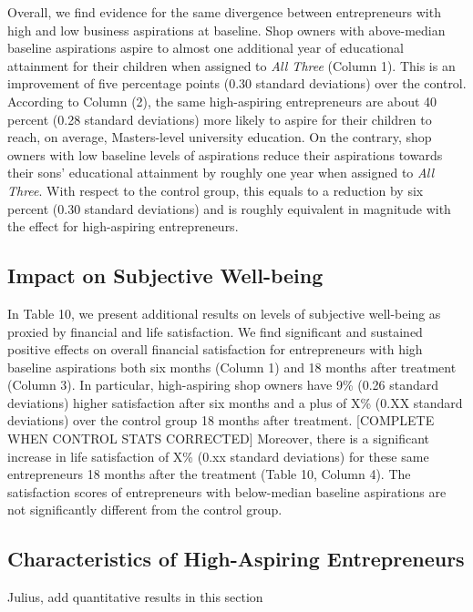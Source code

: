 \documentclass[11.5pt]{article}
\begin{document}
Overall, we find evidence for the same divergence between entrepreneurs with high and low business aspirations at baseline. Shop owners with above-median baseline aspirations aspire to almost one additional year of educational attainment for their children when assigned to \emph{All Three} (Column 1). This is an improvement of five percentage points (0.30 standard deviations) over the control. According to Column (2), the same high-aspiring entrepreneurs are about 40 percent (0.28 standard deviations) more likely to aspire for their children to reach, on average, Masters-level university education. On the contrary, shop owners with low baseline levels of aspirations reduce their aspirations towards their sons' educational attainment by roughly one year when assigned to \emph{All Three}. With respect to the control group, this equals to a reduction by six percent (0.30 standard deviations) and is roughly equivalent in magnitude with the effect for high-aspiring entrepreneurs.

\subsection{Impact on Subjective Well-being}

In Table 10, we present additional results on levels of subjective well-being as proxied by financial and life satisfaction. We find significant and sustained positive effects on overall financial satisfaction for entrepreneurs with high baseline aspirations both six months (Column 1) and 18 months after treatment (Column 3). In particular, high-aspiring shop owners have 9\% (0.26 standard deviations) higher satisfaction after six months and a plus of X\% (0.XX standard deviations) over the control group 18 months after treatment. [\textcolor[rgb]{1.00,0.00,0.00}{COMPLETE WHEN CONTROL STATS CORRECTED}] Moreover, there is a significant increase in life satisfaction of X\% (0.xx standard deviations) for these same entrepreneurs 18 months after the treatment (Table 10, Column 4). The satisfaction scores of entrepreneurs with below-median baseline aspirations are not significantly different from the control group.

\subsection{Characteristics of High-Aspiring Entrepreneurs}

\textcolor[rgb]{1.00,0.00,0.00}{Julius, add quantitative results in this section}
\end{document}
